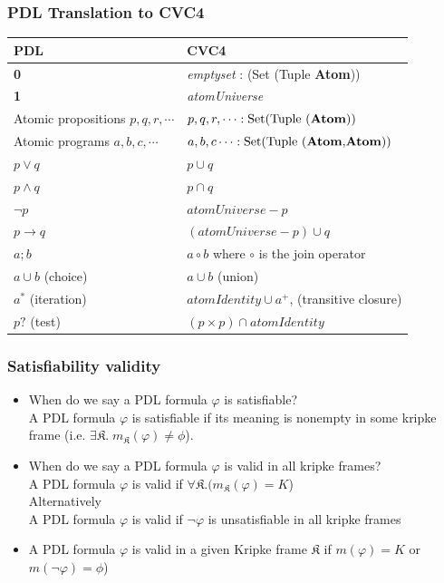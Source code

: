 \documentclass{beamer}
\begin{document}
\begin{frame}[fragile]
\frametitle{PDL Translation to CVC4}
\begin{tabular}{ll} 
\toprule
PDL & CVC4 \\    
\midrule   

\textbf{0} & \textit{emptyset} : (Set (Tuple \textbf{Atom})) \\
\textbf{1} & \textit{atomUniverse} \\
Atomic propositions $p, q, r, \cdots$ & $p, q, r, \cdots : \text{Set(Tuple (\textbf{Atom}))}$ \\
Atomic programs $a, b, c, \cdots$ & $a, b, c \cdots : \text{Set(Tuple (\textbf{Atom}$,$\textbf{Atom}))}$ \\
$p \vee q$ & $p \cup q$ \\
$p \wedge q$ & $p \cap q$ \\
$\neg p$ & $\textit{atomUniverse} - p$ \\
$p \rightarrow q$ & $(\textit{atomUniverse}- p)\cup q$ \\
$a;b$ & $a \circ b$ where $\circ$ is the join operator\\
$a \cup b$ (choice) & $a \cup b$ (union)\\
$a^*$ (iteration) & $\textit{atomIdentity} \cup a^+$, (transitive closure)\\
$p?$ (test) & $(p \times p) \cap \textit{atomIdentity}$\\
\bottomrule
\end{tabular}
\end{frame}

\begin{frame}[fragile]
\frametitle{Satisfiability  validity}

\begin{itemize}
\item When do we say a PDL formula $\varphi$ is satisfiable? \\
\pause
A PDL formula $\varphi$ is satisfiable if its meaning is nonempty in some kripke frame (i.e. $\exists \mathfrak{K} . \; m_{\mathfrak{K}}(\varphi) \neq \phi$). 
\vfill
\item When do we say a PDL formula $\varphi$ is valid in all kripke frames? \\
\pause 
A PDL formula $\varphi$ is valid if  $\forall \mathfrak{K} .(m_{\mathfrak{K}}(\varphi) = K$) \\
Alternatively  \\
A PDL formula $\varphi$ is valid if  $\neg \varphi$ is unsatisfiable in all kripke frames \\
\vfill
\item A PDL formula $\varphi$ is valid in a given Kripke frame $\mathfrak{K}$ if $m(\varphi) = K$ or $m(\neg \varphi) = \phi$)
\end{itemize}

\end{frame}
\end{document}
